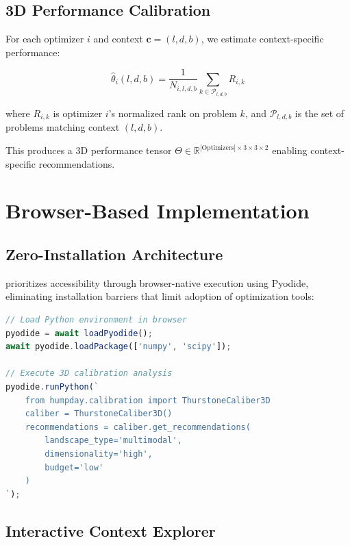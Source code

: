 \documentclass[article]{jss}
\begin{document}
\subsection{3D Performance Calibration}

For each optimizer $i$ and context $\mathbf{c} = (l, d, b)$, we estimate context-specific performance:

\begin{equation}
\hat{\theta}_{i}(l, d, b) = \frac{1}{N_{i,l,d,b}} \sum_{k \in \mathcal{P}_{l,d,b}} R_{i,k}
\end{equation}

where $R_{i,k}$ is optimizer $i$'s normalized rank on problem $k$, and $\mathcal{P}_{l,d,b}$ is the set of problems matching context $(l, d, b)$.

This produces a 3D performance tensor $\Theta \in \mathbb{R}^{|\text{Optimizers}| \times 3 \times 3 \times 2}$ enabling context-specific recommendations.

\section{Browser-Based Implementation} \label{sec:implementation}

\subsection{Zero-Installation Architecture}

 prioritizes accessibility through browser-native execution using Pyodide, eliminating installation barriers that limit adoption of optimization tools:

\begin{lstlisting}[language=JavaScript]
// Load Python environment in browser
pyodide = await loadPyodide();
await pyodide.loadPackage(['numpy', 'scipy']);

// Execute 3D calibration analysis
pyodide.runPython(`
    from humpday.calibration import ThurstoneCaliber3D
    caliber = ThurstoneCaliber3D()
    recommendations = caliber.get_recommendations(
        landscape_type='multimodal',
        dimensionality='high',
        budget='low'
    )
`);
\end{lstlisting}

\subsection{Interactive Context Explorer}
\end{document}
